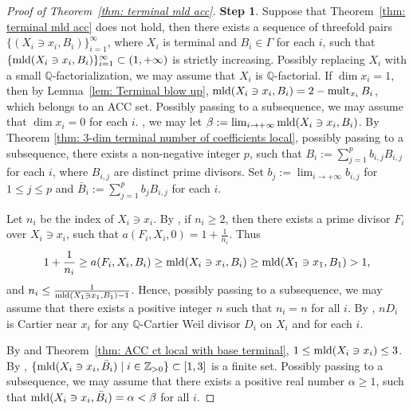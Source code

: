 \documentclass[11pt]{amsart}
\numberwithin{equation}{section}
\newcommand\han[1]{\todo[color=yellow!40]{#1}} %
\newcommand{\Qq}{\mathbb{Q}}
\newcommand{\Zz}{\mathbb{Z}}
\newcommand{\mld}{{\rm{mld}}}
\newcommand{\mult}{\operatorname{mult}}
\newcommand{\Ii}{{\Gamma}}
\theoremstyle{definition}
\theoremstyle{definition}
\begin{document}
\begin{proof}[Proof of Theorem~\ref{thm:  terminal mld acc}]


\noindent\textbf{Step 1}. Suppose that Theorem~\ref{thm:  terminal mld acc} does not hold, then there exists a sequence of threefold pairs $\{(X_i\ni x_i, B_i)\}_{i=1}^{\infty}$, where $X_i$ is terminal and $B_i\in\Ii$ for each $i$, such that $\{\mld(X_i\ni x_i,B_i)\}_{i=1}^{\infty}\subset(1,+\infty)$ is strictly increasing. Possibly replacing $X_i$ with a small $\Qq$-factorialization, we may assume that $X_i$ is $\Qq$-factorial. If $\dim x_i=1$, then by Lemma~\ref{lem: Terminal blow up}, $\mld(X_i\ni x_i, B_i)=2-\mult_{x_i} B_i$, which belongs to an ACC set. Possibly passing to a subsequence, we may assume that $\dim x_i=0$ for each $i$. \cite[Theorem 0.1]{Amb99}, we may let $\beta:=\lim_{i\to+\infty}\mld(X_i\ni x_i,B_i)$. By Theorem \ref{thm: 3-dim terminal number of coefficients local}, possibly passing to a subsequence, there exists a non-negative integer $p$, such that $B_i:=\sum_{j=1}^{p}b_{i,j}B_{i,j}$ for each $i$, where $B_{i,j}$ are distinct prime divisors. Set $b_j:=\lim_{i\to +\infty}b_{i,j}$ for $1\leq j\leq p$ and $\bar B_{i}:=\sum_{j=1}^p b_j B_{i,j}$ for each $i$.



Let $n_i$ be the index of $X_i\ni x_i$. By \cite[Appendix, Theorem]{Sho92}, if $n_i\geq 2$, then there exists a prime divisor $F_i$ over $X_i\ni x_i$, such that $a(F_i,X_i,0)=1+\frac{1}{n_i}$. Thus $$1+\frac{1}{n_i}\geq a(F_i,X_i,B_i)\geq \mld(X_i\ni x_i,B_i)\geq \mld(X_1\ni x_1,B_1)>1,$$ and $n_i\le \frac{1}{\mld(X_1\ni x_1,B_1)-1}$. Hence, possibly passing to a subsequence, we may assume that there exists a positive integer $n$ such that $n_i=n$ for all $i$. By \cite[Lemma~5.1]{Kaw88}, $nD_i$ is Cartier near $x_i$ for any $\Qq$-Cartier Weil divisor $D_i$ on $X_i$ and for each $i$. 

By \cite[Theorem~0.1]{Amb99} and Theorem~\ref{thm: ACC ct local with base terminal}, $1\leq\mld(X_i\ni x_i)\le 3$. By \cite[Corollary~1.3]{Nak16}, $\{\mld(X_i\ni x_i, \bar B_i)\mid i\in \Zz_{>0}\}\subset [1,3]$ is a finite set. Possibly passing to a subsequence, we may assume that there exists a positive real number $\alpha\geq 1$, such that $\mld(X_i\ni x_i,\bar B_i)=\alpha<\beta$ for all $i$. %



\end{proof}
\end{document}
